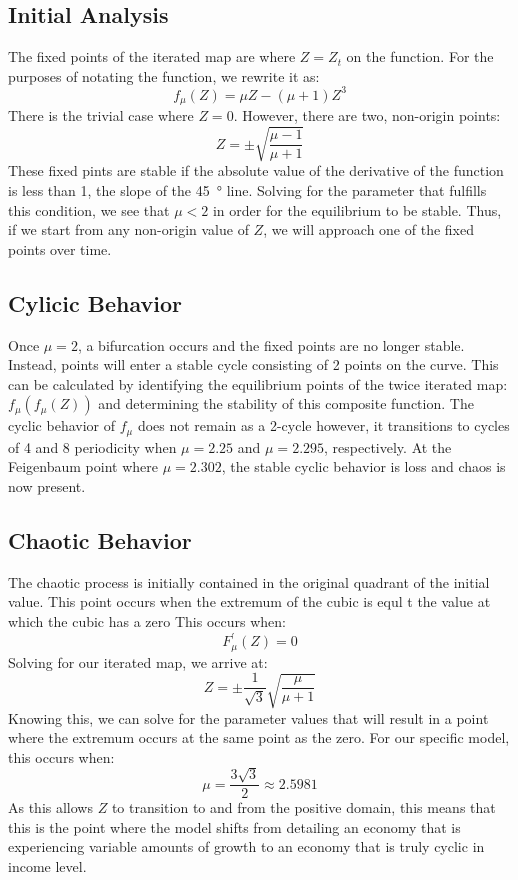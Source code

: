 \documentclass[]{article}
\begin{document}
	\subsection*{Initial Analysis}
		The fixed points of the iterated map are where $Z=Z_t$ on the function. For the purposes of notating the function, we rewrite it as:
		\begin{equation}
			f_\mu(Z)=\mu Z-(\mu+1)Z^3
		\end{equation}
		There is the trivial case where $Z=0$. However, there are two, non-origin points:
		\begin{equation}
			Z=\pm\sqrt{\frac{\mu-1}{\mu+1}}
		\end{equation}
		These fixed pints are stable if the absolute value of the derivative of the function is less than 1, the slope of the \SI{45}{\degree} line. Solving for the parameter that fulfills this condition, we see that $\mu<2$ in order for the equilibrium to be stable. Thus, if we start from any non-origin value of $Z$, we will approach one of the fixed points over time.
	\subsection*{Cylicic Behavior}
		Once $\mu=2$, a bifurcation occurs and the fixed points are no longer stable. Instead, points will enter a stable cycle consisting of 2 points on the curve. This can be calculated by identifying the equilibrium points of the twice iterated map: $f_\mu(f_\mu(Z))$ and determining the stability of this composite function. The cyclic behavior of $f_\mu$ does not remain as a 2-cycle however, it transitions to cycles of 4 and 8 periodicity when $\mu=2.25$ and $\mu=2.295$, respectively. At the Feigenbaum point where $\mu=2.302$, the stable cyclic behavior is loss and chaos is now present.
	\subsection*{Chaotic Behavior}
		The chaotic process is initially contained in the original quadrant of the initial value. This point occurs when the extremum of the cubic is equl t the value at which the cubic has a zero This occurs when:
		\begin{equation}
			F_\mu^\prime(Z)=0
		\end{equation}
		Solving for our iterated map, we arrive at:
		\begin{equation}
			Z=\pm\frac{1}{\sqrt3}\sqrt{\frac{\mu}{\mu+1}}
		\end{equation}
		Knowing this, we can solve for the parameter values that will result in a point where the extremum occurs at the same point as the zero. For our specific model, this occurs when:
		\begin{equation}
			\mu=\frac{3\sqrt3}{2}\approx2.5981
		\end{equation}
		As this allows $Z$ to transition to and from the positive domain, this means that this is the point where the model shifts from detailing an economy that is experiencing variable amounts of growth to an economy that is truly cyclic in income level.
\end{document}
